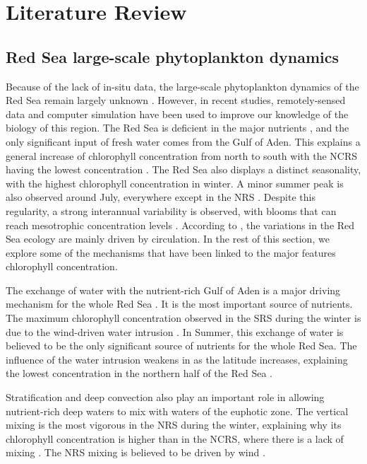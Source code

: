 \chapter{Literature Review}

\section{Red Sea large-scale phytoplankton dynamics}

Because of the lack of in-situ data, the large-scale phytoplankton dynamics of the Red Sea remain largely unknown \cite{Raitsos2013, Triantafyllou2014}. However, in recent studies, remotely-sensed data and computer simulation have been used to improve our knowledge of the biology of this region. The Red Sea is deficient in the major nutrients \cite{Weikert1987}, and the only significant input of fresh water comes from the Gulf of Aden. This explains a general increase of chlorophyll concentration from north to south with the NCRS having the lowest concentration \cite{Raitsos2013}. The Red Sea also displays a distinct seasonality, with the highest chlorophyll concentration in winter. A minor summer peak is also observed around July, everywhere except in the NRS \cite{Raitsos2013}. Despite this regularity, a strong interannual variability is observed, with blooms that can reach mesotrophic concentration levels \cite{Raitsos2013}. According to \cite{Triantafyllou2014}, the variations in the Red Sea ecology are mainly driven by circulation. In the rest of this section, we explore some of the mechanisms that have been linked to the major features chlorophyll concentration.

The exchange of water with the nutrient-rich Gulf of Aden is a major driving mechanism for the whole Red Sea \cite{Triantafyllou2014}. It is the most important source of nutrients. The maximum chlorophyll concentration observed in the SRS during the winter is due to the wind-driven water intrusion \cite{Raitsos2013}. In Summer, this exchange of water is believed to be the only significant source of nutrients for the whole Red Sea. The influence of the water intrusion weakens in as the latitude increases, explaining the lowest concentration in the northern half of the Red Sea \cite{Raitsos2013}.

Stratification and deep convection also play an important role in allowing nutrient-rich deep waters to mix with waters of the euphotic zone. The vertical mixing is the most vigorous in the NRS during the winter, explaining why its chlorophyll concentration is higher than in the NCRS, where there is a lack of mixing \cite{Raitsos2013}. The NRS mixing is believed to be driven by wind \cite{Raitsos2013}.

